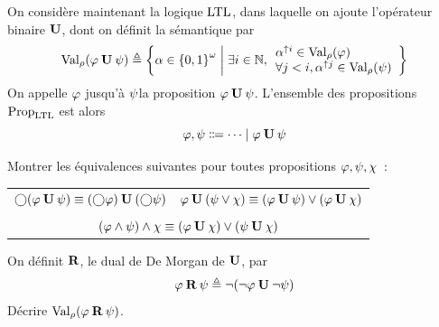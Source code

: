\begin{problem}

  On considère maintenant la logique $\operatorname{LTL}$, dans laquelle on ajoute
  l'opérateur binaire $\mathbin{\textbf{U}}$, dont on définit la sémantique par
  \[\operatorname{Val}_{\rho}(\varphi\mathbin{\textbf{U}}\psi) \triangleq
  \left\{ \alpha\in{\{0,1\}}^{\omega} \;\middle\vert\; \exists i \in \mathbb N,
    \begin{array}{l}
      \alpha^{\uparrow i} \in\operatorname{Val}_{\rho}(\varphi)\\
      \forall j < i, \alpha^{\uparrow j}\in\operatorname{Val}_{\rho}(\psi)
    \end{array}
   \right\}\]
  On appelle \og $\varphi$ jusqu'à $\psi$\fg la proposition
  $\varphi\mathbin{\textbf{U}}\psi$.
  L'ensemble des propositions $\operatorname{Prop}_{\operatorname{LTL}}$ est alors
  \[\varFF,\varFP\inddefeq\cdots\mid \varFF\modU\varFP\]

  \begin{pbQuest}
  \item Montrer les équivalences suivantes pour toutes propositions
    $\varphi,\psi,\chi$~:
    \begin{center}
      \begin{tabular}{cc}
        $\mathbin{\bigcirc}(\varphi\mathbin{\textbf{U}}\psi) \equiv
        (\mathbin{\bigcirc}\varphi)\mathbin{\textbf{U}}(\mathbin{\bigcirc}\psi)$
        &
        $\varphi\mathbin{\textbf{U}}(\psi\lor\chi)\equiv
        (\varphi\mathbin{\textbf{U}}\psi)\lor(\varphi\mathbin{\textbf{U}}\chi)$
        \\
        \\
        \multicolumn{2}{c}{
          $(\varphi\land\psi)\land\chi\equiv
          (\varphi\mathbin{\textbf{U}}\chi)\lor(\psi\mathbin{\textbf{U}}\chi)$}
      \end{tabular}
    \end{center}
  \item On définit $\mathbin{\textbf{R}}$, le dual de De Morgan de $\mathbin{\textbf{U}}$, par
    \[\varphi\mathbin{\textbf{R}}\psi\triangleq \lnot(\lnot\varphi\mathbin{\textbf{U}}\lnot\psi)\]
    Décrire $\operatorname{Val}_{\rho}(\varphi\mathbin{\textbf{R}}\psi)$.
  \end{pbQuest}


\end{problem}
